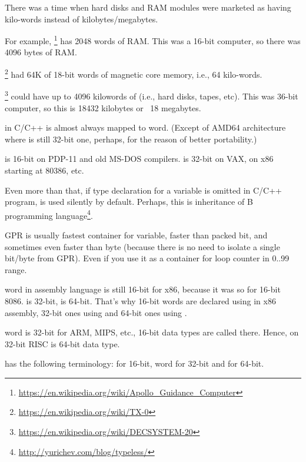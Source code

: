 There was a time when hard disks and \ac{RAM} modules were marketed as having  kilo-words instead of
 kilobytes/megabytes.

For example, \footnote{\url{https://en.wikipedia.org/wiki/Apollo_Guidance_Computer}}
has 2048 words of \ac{RAM}.
This was a 16-bit computer, so there was 4096 bytes of \ac{RAM}.

\footnote{\url{https://en.wikipedia.org/wiki/TX-0}} had 64K of 18-bit words of magnetic core memory,
i.e., 64 kilo-words.

\footnote{\url{https://en.wikipedia.org/wiki/DECSYSTEM-20}}
could have up to 4096 kilowords of 
(i.e., hard disks, tapes, etc).
This was 36-bit computer, so this is 18432 kilobytes or ~18 megabytes.

\myhrule{}

 in C/C++ is almost always mapped to \gls{word}.
(Except of AMD64 architecture where  is still 32-bit one, perhaps, for the reason of better portability.)

 is 16-bit on PDP-11 and old MS-DOS compilers.
 is 32-bit on VAX, on x86 starting at 80386, etc.

Even more than that, if type declaration for a variable is omitted in C/C++ program,  is used silently by default.
Perhaps, this is inheritance of B programming language\footnote{\url{http://yurichev.com/blog/typeless/}}.

\myhrule{}

\ac{GPR} is usually fastest container for variable, faster than packed bit,
and sometimes even faster than byte (because there is no need to isolate a single bit/byte from \ac{GPR}).
Even if you use it as a container for loop counter in 0..99 range.

\myhrule{}

\Gls{word} in assembly language is still 16-bit for x86, because it was so for 16-bit 8086.
 is 32-bit,  is 64-bit.
That's why 16-bit words are declared using  in x86 assembly, 32-bit ones using  and 64-bit ones using .

\Gls{word} is 32-bit for ARM, MIPS, etc., 16-bit data types are called  there.
Hence,  on 32-bit RISC is 64-bit data type.

 has the following terminology:  for 16-bit, \gls{word} for 32-bit and  for 64-bit.

